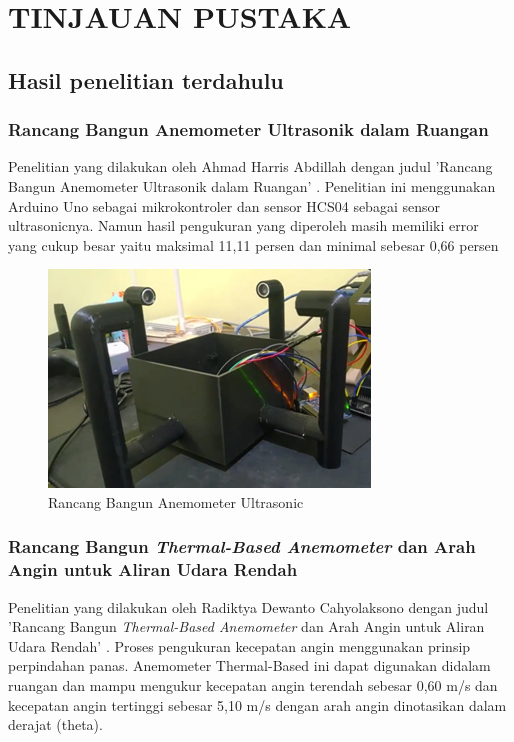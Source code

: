 \section{TINJAUAN PUSTAKA}

\subsection{Hasil penelitian terdahulu}
\subsubsection{Rancang Bangun Anemometer Ultrasonik dalam Ruangan}

Penelitian yang dilakukan oleh Ahmad Harris Abdillah dengan judul 'Rancang Bangun Anemometer 
Ultrasonik dalam Ruangan' \parencite{Abdillah2022}. Penelitian ini menggunakan Arduino Uno sebagai mikrokontroler
dan sensor HCS04 sebagai sensor ultrasonicnya. Namun hasil pengukuran yang diperoleh
masih memiliki error yang cukup besar yaitu maksimal 11,11 persen dan minimal sebesar 0,66 persen

\begin{figure}[h!]
	\centering
	\includegraphics[width=0.5\linewidth]{gambar/fig_anemometer_abdillah_prototipe}
	\caption{Rancang Bangun Anemometer Ultrasonic \parencite{Abdillah2022}}
	\label{abdillah_anemo_prototipe}
\end{figure}

\subsubsection{Rancang Bangun \emph{Thermal-Based Anemometer} dan Arah Angin untuk Aliran Udara Rendah}

Penelitian yang dilakukan oleh Radiktya Dewanto Cahyolaksono dengan judul 'Rancang Bangun \emph{Thermal-Based Anemometer} dan Arah Angin untuk 
Aliran Udara Rendah' \parencites{Cahyolaksono2022}. Proses pengukuran kecepatan angin menggunakan prinsip perpindahan panas. Anemometer Thermal-Based
ini dapat digunakan didalam ruangan dan mampu mengukur kecepatan angin terendah sebesar 0,60 m/s dan kecepatan angin
tertinggi sebesar 5,10 m/s dengan arah angin dinotasikan dalam derajat (theta).

